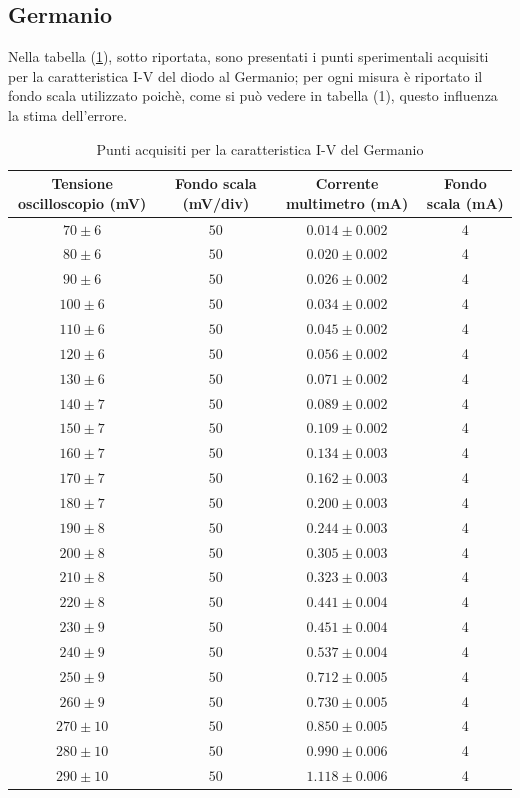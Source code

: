 \documentclass[]{article}
\begin{document}
\subsection{Germanio}
Nella tabella (\ref{tab:germanio}), sotto riportata, sono presentati i punti sperimentali acquisiti per la caratteristica I-V del diodo al Germanio; per ogni misura è riportato il fondo scala utilizzato poichè, come si può vedere in tabella (1), questo influenza la stima dell'errore.
	\begin{table}[H]
		\centering
	\begin{tabular}{|c|c|c|c|}
		\hline
		Tensione oscilloscopio (mV)& Fondo scala (mV/div) & Corrente multimetro (mA) &Fondo scala (mA)\\
		\hline
		$ 70\pm 6 $ &$ 50 $ & $ 0.014\pm 0.002 $ &4 \\
		\hline
		$ 80\pm 6$ &$ 50 $ & $ 0.020\pm 0.002 $&4 \\
		\hline
		$ 90\pm 6$ &$ 50 $ & $ 0.026\pm 0.002 $&4 \\
		\hline
		$ 100\pm 6 $ &$ 50 $ & $ 0.034\pm 0.002 $&4 \\
		\hline
		$110\pm 6 $ &$ 50 $ & $ 0.045\pm 0.002 $&4 \\
		\hline
		$ 120\pm 6 $ &$ 50 $ & $ 0.056\pm 0.002 $&4 \\
		\hline
		$ 130\pm 6$ &$ 50 $ & $ 0.071\pm 0.002 $&4 \\
		\hline
		$ 140\pm 7$ &$ 50 $ & $ 0.089\pm 0.002 $&4 \\
		\hline
		$ 150\pm 7$ &$ 50 $ & $ 0.109\pm 0.002 $&4 \\
		\hline
		$ 160\pm 7$ &$ 50 $ & $ 0.134\pm 0.003 $&4 \\
		\hline
		$ 170\pm 7$ &$ 50 $ & $ 0.162\pm 0.003 $&4 \\
		\hline
		$ 180\pm 7$ &$ 50 $ & $ 0.200\pm 0.003 $&4 \\
		\hline
		$ 190\pm 8$ &$ 50 $ & $ 0.244\pm 0.003 $&4 \\
		\hline
		$ 200\pm 8$ &$ 50 $ & $ 0.305\pm 0.003 $&4 \\
		\hline
		$ 210\pm 8$ &$ 50 $ & $ 0.323\pm 0.003 $&4 \\
		\hline
		$ 220\pm 8$ &$ 50 $ & $ 0.441\pm 0.004 $&4 \\
		\hline
		$ 230\pm 9$ &$ 50 $ & $ 0.451\pm 0.004 $&4 \\
		\hline
		$ 240\pm 9$ &$ 50 $ & $ 0.537\pm 0.004 $&4 \\
		\hline
		$ 250\pm 9$ &$ 50 $ & $ 0.712\pm 0.005 $&4 \\
		\hline
		$ 260\pm 9$ &$ 50 $ & $ 0.730\pm 0.005 $&4 \\
		\hline
		$ 270\pm 10$ &$ 50 $ & $ 0.850\pm 0.005 $&4 \\
		\hline
		$ 280\pm 10$ &$ 50 $ & $ 0.990\pm 0.006 $&4 \\
		\hline
		$ 290\pm 10$ &$ 50 $ & $ 1.118\pm 0.006 $&4 \\
		\hline
	\end{tabular}
\caption{Punti acquisiti per la caratteristica I-V del Germanio}
\label{tab:germanio}
\end{table}
\end{document}
